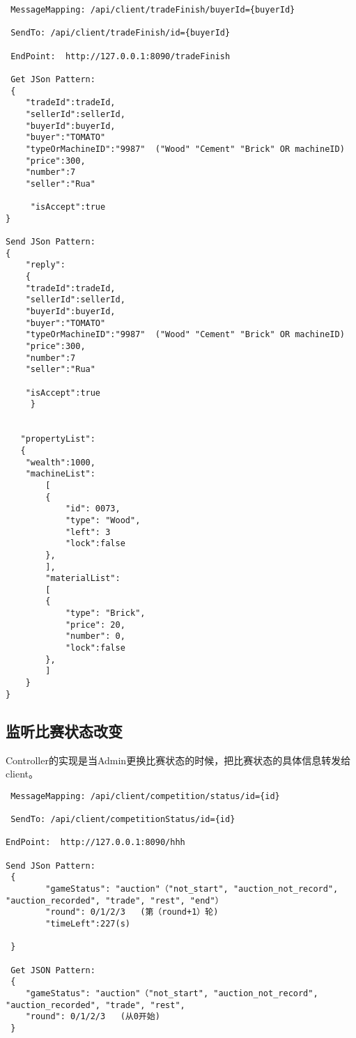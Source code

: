 \documentclass{article}
\begin{document}
\begin{lstlisting}
 MessageMapping: /api/client/tradeFinish/buyerId={buyerId}

 SendTo: /api/client/tradeFinish/id={buyerId}

 EndPoint:  http://127.0.0.1:8090/tradeFinish

 Get JSon Pattern:
 {
    "tradeId":tradeId,
    "sellerId":sellerId,
    "buyerId":buyerId,
    "buyer":"TOMATO"
    "typeOrMachineID":"9987"  ("Wood" "Cement" "Brick" OR machineID)
    "price":300,
    "number":7
    "seller":"Rua"

     "isAccept":true
}

Send JSon Pattern:
{
    "reply":
    {
    "tradeId":tradeId,
    "sellerId":sellerId,
    "buyerId":buyerId,
    "buyer":"TOMATO"
    "typeOrMachineID":"9987"  ("Wood" "Cement" "Brick" OR machineID)
    "price":300,
    "number":7
    "seller":"Rua"

    "isAccept":true
     }


   "propertyList":
   {
   	"wealth":1000,
   	"machineList":
    	[
        {
            "id": 0073,
            "type": "Wood",
            "left": 3
            "lock":false
        },
    	],
    	"materialList":
    	[
        {
            "type": "Brick",
            "price": 20,
            "number": 0,
            "lock":false
        },
    	]
    }
}
\end{lstlisting}

				\subsection{监听比赛状态改变}

                Controller的实现是当Admin更换比赛状态的时候，把比赛状态的具体信息转发给client。

\begin{lstlisting}
 MessageMapping: /api/client/competition/status/id={id}

 SendTo: /api/client/competitionStatus/id={id}

EndPoint:  http://127.0.0.1:8090/hhh

Send JSon Pattern:
 {
    	"gameStatus": "auction"（"not_start", "auction_not_record", "auction_recorded", "trade", "rest", "end"）
        "round": 0/1/2/3   (第（round+1）轮)
        "timeLeft":227(s)

 }

 Get JSON Pattern:
 {
    "gameStatus": "auction"（"not_start", "auction_not_record", "auction_recorded", "trade", "rest",
    "round": 0/1/2/3   (从0开始)
 }
\end{lstlisting}
\end{document}
